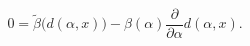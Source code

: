 \begin{equation}
0 = \tilde\beta\Big(d(\alpha,x)\Big)
- \beta(\alpha) \frac{\partial}{\partial\alpha} d(\alpha,x).
\end{equation}

